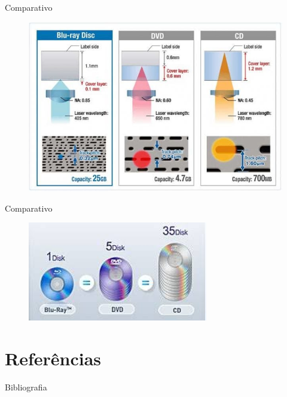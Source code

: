 \documentclass[aspectratio=169,
				xcolor=table]{beamer}
\begin{document}
	\begin{frame}{Comparativo}
				\begin{figure}[hbtp]
			\centering
			\includegraphics[height=0.8\textheight, keepaspectratio]{../figs/cap08/otico2}
		\end{figure}
	\end{frame}
	
	\begin{frame}{Comparativo}
				\begin{figure}[hbtp]
			\centering
			\includegraphics[width=0.7\textwidth, keepaspectratio]{../figs/cap08/otico3}
		\end{figure}
	\end{frame}
	

	\section{Referências}
	\begin{frame}{Bibliografia}
		\nocite{Englander2011}
		\nocite{Monteiro2010}
		\nocite{Stallings2010}
		\nocite{Vatto2012}
		\nocite{Tanenbaum2007}
    	
    	
    	
	
	\end{frame}
\end{document}
